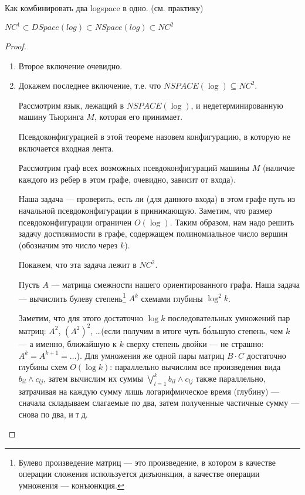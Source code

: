 Как комбинировать два logspace в одно. (см. практику) 

\begin{theorem}
	$NC^1 \subset DSpace(log) \subset NSpace(log) \subset NC^2$\\
\end{theorem}
  
\begin{proof} 
	\begin{enumerate}
	\item Второе включение очевидно.

	\item Докажем последнее включение, т.е. что $NSPACE(\log) \subseteq NC^2$.
	
	Рассмотрим язык, лежащий в $NSPACE(\log)$, и недетерминированную машину Тьюринга $M$, которая его принимает. 

	\begin{Def}
		Псевдоконфигурацией в этой теореме назовем конфигурацию, в которую не включается входная лента.
	\end{Def}

	Рассмотрим граф всех возможных псевдоконфигураций машины $M$ (наличие каждого из ребер в этом графе, очевидно, зависит от входа).

	Наша задача --- проверить, есть ли (для данного входа) в этом графе путь из начальной псевдоконфигурации в принимающую.
	Заметим, что размер псевдоконфигурации ограничен $O(\log)$. Таким образом, нам надо решить задачу достижимости в графе, содержащем
	полиномиальное число вершин (обозначим это число через $k$).

	Покажем, что эта задача лежит в $NC^2$. 
	
	Пусть $A$ --- матрица смежности нашего ориентированного графа.
	Наша задача --- вычислить булеву степень\footnote{Булево произведение
	матриц --- это произведение, в котором в качестве операции сложения
	используется дизъюнкция, а качестве операции умножения --- конъюнкция.} 
	$A^k$ схемами глубины $\log^2k$.

	Заметим, что для этого достаточно $\log k$ последовательных умножений 
	пар матриц: $A^2$, $(A^2)^2$, \ldots (если получим в итоге чуть б\'ольшую
	степень, чем $k$ --- а именно, ближайшую к $k$ сверху степень двойки ---
	не страшно: $A^k=A^{k+1}=\ldots$). Для умножения же одной пары матриц 
	$B\cdot C$ достаточно глубины схем $O(\log k)$:
	параллельно вычислим все произведения вида $b_{il}\land c_{lj}$,
	затем вычислим их суммы $\bigvee_{l=1}^k b_{il}\land c_{lj}$ также параллельно,
	затрачивая на каждую сумму лишь логарифмическое время (глубину) ---
	сначала складываем слагаемые по два, затем полученные частичные сумму ---
	снова по два, и$\;$т$\;$д.


\end{enumerate}
\end{proof}
